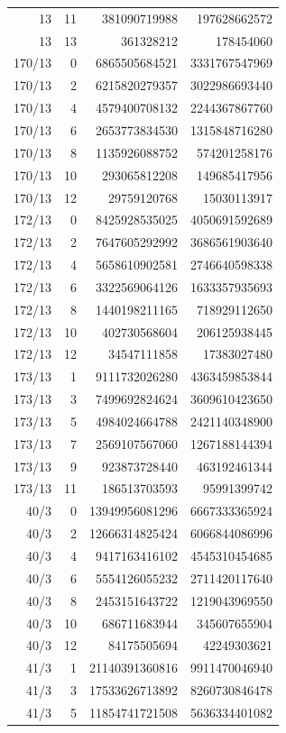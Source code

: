 \begin{longtable}{@{}rrrr@{}}
13 & 11 & 381090719988 & 197628662572\\
13 & 13 & 361328212 & 178454060\\
170/13 & 0 & 6865505684521 & 3331767547969\\
170/13 & 2 & 6215820279357 & 3022986693440\\
170/13 & 4 & 4579400708132 & 2244367867760\\
170/13 & 6 & 2653773834530 & 1315848716280\\
170/13 & 8 & 1135926088752 & 574201258176\\
170/13 & 10 & 293065812208 & 149685417956\\
170/13 & 12 & 29759120768 & 15030113917\\
172/13 & 0 & 8425928535025 & 4050691592689\\
172/13 & 2 & 7647605292992 & 3686561903640\\
172/13 & 4 & 5658610902581 & 2746640598338\\
172/13 & 6 & 3322569064126 & 1633357935693\\
172/13 & 8 & 1440198211165 & 718929112650\\
172/13 & 10 & 402730568604 & 206125938445\\
172/13 & 12 & 34547111858 & 17383027480\\
173/13 & 1 & 9111732026280 & 4363459853844\\
173/13 & 3 & 7499692824624 & 3609610423650\\
173/13 & 5 & 4984024664788 & 2421140348900\\
173/13 & 7 & 2569107567060 & 1267188144394\\
173/13 & 9 & 923873728440 & 463192461344\\
173/13 & 11 & 186513703593 & 95991399742\\
40/3 & 0 & 13949956081296 & 6667333365924\\
40/3 & 2 & 12666314825424 & 6066844086996\\
40/3 & 4 & 9417163416102 & 4545310454685\\
40/3 & 6 & 5554126055232 & 2711420117640\\
40/3 & 8 & 2453151643722 & 1219043969550\\
40/3 & 10 & 686711683944 & 345607655904\\
40/3 & 12 & 84175505694 & 42249303621\\
41/3 & 1 & 21140391360816 & 9911470046940\\
41/3 & 3 & 17533626713892 & 8260730846478\\
41/3 & 5 & 11854741721508 & 5636334401082\\

\end{longtable}
